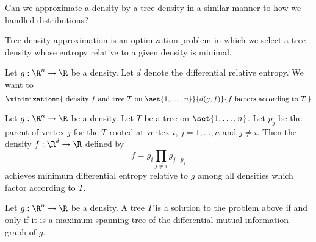 
Can we approximate a density by a tree density in a similar manner to how we handled distributions?


Tree density approximation is an optimization problem in which we select a tree density whose entropy relative to a given density is minimal.


Let $g: \R^n \to \R$ be a density.
Let $d$ denote the differential
relative entropy.
We want to
\[
  \minimizationn{
    \text{ density } f \text{ and tree } T \text{ on } \set{1, \dots, n}
  }{
    d(g, f)
  }{
    f \text{ factors according to } T.
  }
\]


\begin{prop}
  Let $g: \R^n \to \R$ be a density.
  Let $T$ be
  a tree on $\set{1, \dots, n}$.
  Let $p_j$ be
  the parent of vertex $j$ for the $T$ rooted
  at vertex $i$, $j = 1,\dots,n$ and $j \neq i$.
  Then the density $f: \R^d \to \R$ defined by
  \[
    f = g_i \prod_{j \neq i} g_{j \mid p_j}
  \]
  achieves minimum differential entropy relative to $g$ among
  all densities which factor according to $T$.
\end{prop}

\begin{prop}
  Let $g: \R^n \to \R$ be a density.
  A tree $T$ is a solution to the problem above
  if and only if it is a maximum spanning
  tree of the differential mutual information graph of $g$.
\end{prop}
\strats
